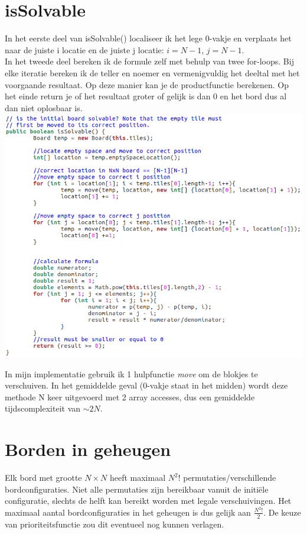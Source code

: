 \documentclass[11pt, a4paper]{article}
\begin{document}
\section*{isSolvable}
In het eerste deel van isSolvable() localiseer ik het lege 0-vakje en verplaats het naar de juiste i locatie en de juiste j locatie: $i=N-1$, $j=N-1$.\\
In het tweede deel bereken ik de formule zelf met behulp van twee for-loops. Bij elke iteratie bereken ik de teller en noemer en vermenigvuldig het deeltal met het voorgaande resultaat. Op deze manier kan je de productfunctie berekenen. Op het einde return je of het resultaat groter of gelijk is dan 0 en het bord dus al dan niet oplosbaar is.\\
\vspace*{10px}
\includegraphics[width=\textwidth]{isSolvable}\\
\vspace*{10px}

In mijn implementatie gebruik ik 1 hulpfunctie \emph{move} om de blokjes te verschuiven. In het gemiddelde geval (0-vakje staat in het midden) wordt deze methode N keer uitgevoerd met 2 array accesses, dus een gemiddelde tijdscomplexiteit van $\sim 2N$.

\newpage
\section*{Borden in geheugen}
Elk bord met grootte $N \times N$ heeft maximaal $N^2$! permutaties/verschillende bordconfiguraties. Niet alle permutaties zijn bereikbaar vanuit de initi\"ele configuratie, slechts de helft kan bereikt worden met legale verschuivingen. Het maximaal aantal bordconfiguraties in het geheugen is dus gelijk aan $\frac{N^2!}{2}$. De keuze van prioriteitsfunctie zou dit eventueel nog kunnen verlagen.
	
\end{document}
